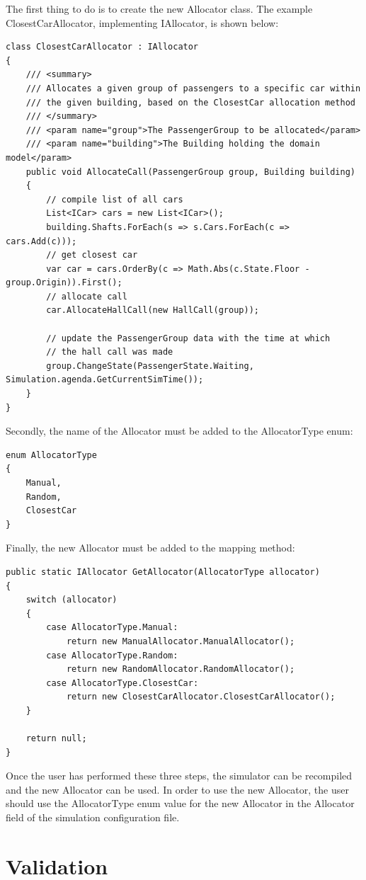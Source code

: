 \documentclass{UoYCSproject}
\begin{document}
The first thing to do is to create the new Allocator class.  The example ClosestCarAllocator, implementing IAllocator, is shown below:

\begin{lstlisting}
class ClosestCarAllocator : IAllocator
{
	/// <summary>
	/// Allocates a given group of passengers to a specific car within
	/// the given building, based on the ClosestCar allocation method
	/// </summary>
	/// <param name="group">The PassengerGroup to be allocated</param>
	/// <param name="building">The Building holding the domain model</param>
	public void AllocateCall(PassengerGroup group, Building building)
	{
		// compile list of all cars
		List<ICar> cars = new List<ICar>();
		building.Shafts.ForEach(s => s.Cars.ForEach(c => cars.Add(c)));
		// get closest car
		var car = cars.OrderBy(c => Math.Abs(c.State.Floor - group.Origin)).First();
		// allocate call
		car.AllocateHallCall(new HallCall(group));
	
		// update the PassengerGroup data with the time at which
		// the hall call was made
		group.ChangeState(PassengerState.Waiting, Simulation.agenda.GetCurrentSimTime());
	}
}
\end{lstlisting}

Secondly, the name of the Allocator must be added to the AllocatorType enum:

\begin{lstlisting}
enum AllocatorType
{
	Manual,
	Random,
	ClosestCar
}
\end{lstlisting}

Finally, the new Allocator must be added to the mapping method:

\begin{lstlisting}
public static IAllocator GetAllocator(AllocatorType allocator)
{
	switch (allocator)
	{
		case AllocatorType.Manual:
			return new ManualAllocator.ManualAllocator();
		case AllocatorType.Random:
			return new RandomAllocator.RandomAllocator();
		case AllocatorType.ClosestCar:
			return new ClosestCarAllocator.ClosestCarAllocator();
	}
	
	return null;
}
\end{lstlisting}

Once the user has performed these three steps, the simulator can be recompiled and the new Allocator can be used.  In order to use the new Allocator, the user should use the AllocatorType enum value for the new Allocator in the Allocator field of the simulation configuration file.

\section{Validation}
\end{document}
